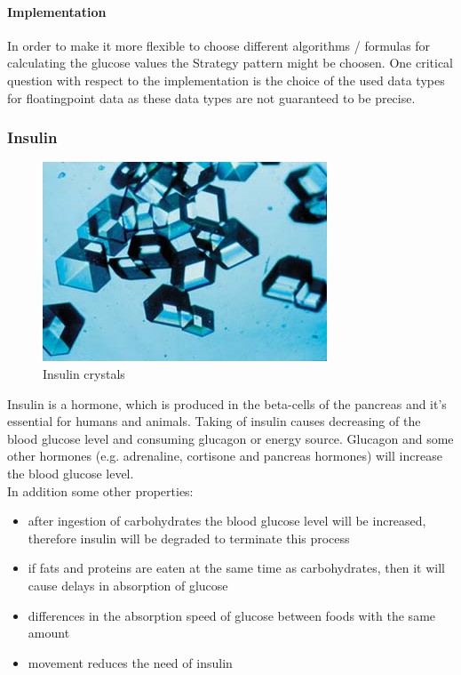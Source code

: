 \documentclass[pdflatex,a4paper,11pt,english]{scrreprt}
\begin{document}
\paragraph{Implementation} 
In order to make it more flexible to choose different algorithms / formulas for
calculating the glucose values the Strategy pattern might be choosen. One
critical question with respect to the implementation is the choice of the used
data types for floatingpoint data as these data types are not guaranteed to be precise.

\newpage

\subsubsection{Insulin}

\begin{figure}[htb]
\centering
\includegraphics[scale=0.4]{images/Insulincrystals}
\caption{Insulin crystals}
\end{figure}
Insulin is a hormone, which is produced in the beta-cells of the pancreas and it's essential for humans and animals. 
Taking of insulin causes decreasing of the blood glucose level and consuming glucagon or energy source. 
Glucagon and some other hormones (e.g. adrenaline, cortisone and pancreas hormones) will increase the blood glucose level.\\

In addition some other properties:
\begin{itemize}
  \item after ingestion of carbohydrates the blood glucose level will be increased, 
	  therefore insulin will be degraded to terminate this process
  \item if fats and proteins are eaten at the same time as carbohydrates, 
	  then it will cause delays in absorption of glucose
  \item differences in the absorption speed of glucose between foods with the same amount
  \item movement reduces the need of insulin
\end{itemize}
\end{document}
